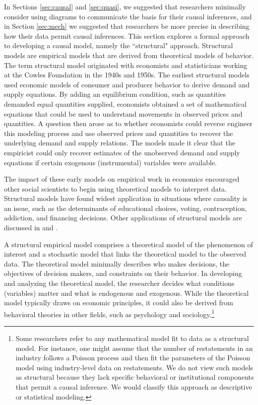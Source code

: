 \documentclass[12pt,reqno,titlepage]{amsart}
\theoremstyle{definition}
\begin{document}
\begin{doublespace}
In Sections \ref{sec:causal} and \ref{sec:quasi}, we suggested that researchers minimally consider using diagrams to communicate the basis for their causal inferences, and in Section \ref{sec:mech} we suggested that researchers be more precise in describing how their data permit causal
inferences.
This section explores a formal approach to developing a causal model, 
namely the ``structural" approach.
Structural models are empirical models that are derived from theoretical models of behavior.
The term structural model originated with economists and statisticians working at the Cowles Foundation in the 1940s and 1950s.
The earliest structural models used economic models of consumer and producer behavior to derive demand and supply equations.
By adding an equilibrium condition, such as quantities demanded equal quantities supplied, economists obtained a set of mathematical equations that could be used to understand movements in observed prices and quantities. A question then arose as to whether economists could reverse engineer this modeling process and use observed prices and quantities to recover the underlying demand and supply relations.
The models made it clear that the empiricist could only recover estimates of the unobserved demand and supply equations if certain exogenous (instrumental) variables were available. 

The impact of these early models on empirical work in economics encouraged other social scientists to begin using theoretical models to interpret data. 
Structural models have found widest application in situations where causality is an issue, such as the determinants of educational choices, voting, contraception, addiction, and financing decisions. 
Other applications of structural models are discussed in \citet{Reiss:2007ej} and \citet{Reiss:2011go}.

A structural empirical model comprises a theoretical model of the phenomenon of interest and a stochastic model that links the theoretical model to the observed data.
The theoretical model minimally describes who makes decisions, the objectives of decision makers, and constraints on their behavior.
In developing and analyzing the theoretical model, the researcher decides what conditions (variables) matter and what is endogenous and exogenous.
While the theoretical model typically draws on economic principles, it could also be derived from behavioral theories in other fields, such as psychology and sociology.\footnote{Some
researchers refer to any mathematical model fit to data as a structural model. For instance,
one might assume that the number of restatements in an industry follows a Poisson process
and then fit the parameters of the Poisson model using industry-level data on restatements.
We do not view such models as structural because they lack specific behavioral or institutional components that permit a causal inference.
We would classify this approach as descriptive or statistical modeling.}


\end{doublespace}
\end{document}
